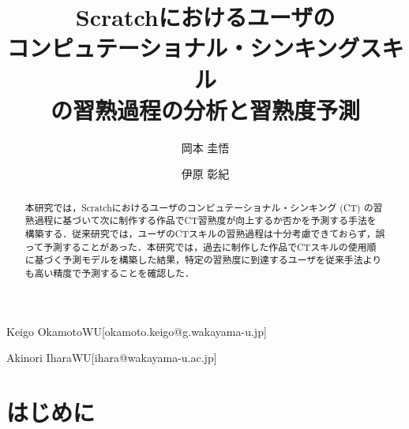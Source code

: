 \documentclass[submit,ses,noauthor]{ipsj}
\begin{document}
\title{Scratchにおけるユーザの\\コンピュテーショナル・シンキングスキル\\の習熟過程の分析と習熟度予測}


\author{岡本 圭悟}{Keigo Okamoto}{WU}[okamoto.keigo@g.wakayama-u.jp]
\author{伊原 彰紀}{Akinori Ihara}{WU}[ihara@wakayama-u.ac.jp]

\begin{abstract}
本研究では，Scratchにおけるユーザのコンピュテーショナル・シンキング (CT) の習熟過程に基づいて次に制作する作品でCT習熟度が向上するか否かを予測する手法を構築する．従来研究では，ユーザのCTスキルの習熟過程は十分考慮できておらず，誤って予測することがあった．本研究では，過去に制作した作品でCTスキルの使用順に基づく予測モデルを構築した結果，特定の習熟度に到達するユーザを従来手法よりも高い精度で予測することを確認した．
\end{abstract}


%
%
%

\maketitle

\section{はじめに}
\end{document}
